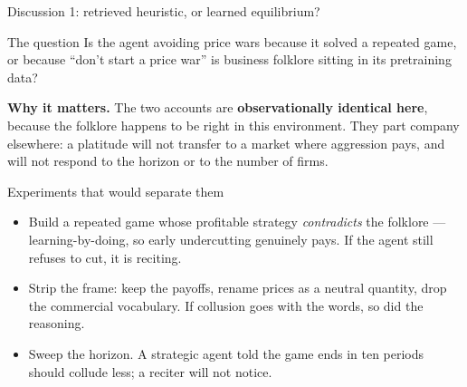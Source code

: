 \documentclass[aspectratio=169,9pt]{beamer}
\newcommand{\orange}[1]{\textcolor{AmazonOrange}{\textbf{#1}}}
\begin{document}
\begin{frame}{Discussion 1: retrieved heuristic, or learned equilibrium?}
\begin{block}{The question}
Is the agent avoiding price wars because it solved a repeated game, or because ``don't start a price war'' is
business folklore sitting in its pretraining data?
\end{block}
\pause
\vspace{0.1cm}
\textbf{Why it matters.} The two accounts are \orange{observationally identical here}, because the folklore
happens to be right in this environment. They part company elsewhere: a platitude will not transfer to a market
where aggression pays, and will not respond to the horizon or to the number of firms.
\pause
\vspace{0.1cm}
\begin{block}{Experiments that would separate them}
\begin{itemize}
    \item Build a repeated game whose profitable strategy \textit{contradicts} the folklore --- learning-by-doing,
    so early undercutting genuinely pays. If the agent still refuses to cut, it is reciting.
    \item Strip the frame: keep the payoffs, rename prices as a neutral quantity, drop the commercial
    vocabulary. If collusion goes with the words, so did the reasoning.
    \item Sweep the horizon. A strategic agent told the game ends in ten periods should collude less; a reciter
    will not notice.
\end{itemize}
\end{block}
\end{frame}
\end{document}
